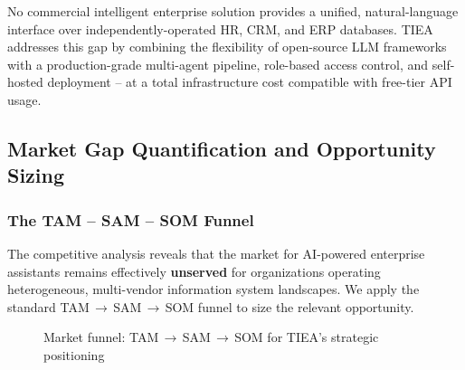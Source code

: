 \documentclass[12pt,a4paper]{report}
\begin{document}
\begin{insightbox}
No commercial intelligent enterprise solution provides a unified, natural-language interface over
independently-operated HR, CRM, and ERP databases.
TIEA addresses this gap by combining the flexibility of open-source LLM frameworks with a
production-grade multi-agent pipeline, role-based access control, and self-hosted deployment --
at a total infrastructure cost compatible with free-tier API usage.
\end{insightbox}

\subsection{Market Gap Quantification and Opportunity Sizing}

\subsubsection{The TAM -- SAM -- SOM Funnel}

The competitive analysis reveals that the market for AI-powered enterprise assistants remains
effectively \textbf{unserved} for organizations operating heterogeneous, multi-vendor information
system landscapes.
We apply the standard TAM\,$\to$\,SAM\,$\to$\,SOM funnel to size the relevant opportunity.

\begin{figure}[H]
\centering
{}
\caption{Market funnel: TAM\,$\to$\,SAM\,$\to$\,SOM for TIEA's strategic positioning}
\label{fig:market-funnel}
\end{figure}
\end{document}
